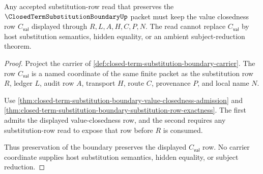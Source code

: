 \begin{theorem}
\label{thm:closed-term-substitution-boundary-closed-value-preservation}
Any accepted substitution-row read that preserves the $\ClosedTermSubstitutionBoundaryUp$ packet must keep the value closedness row $C_{\mathsf{val}}$ displayed through $R,L,A,H,C,P,N$. The read cannot replace $C_{\mathsf{val}}$ by host substitution semantics, hidden equality, or an ambient subject-reduction theorem.
\end{theorem}
\begin{proof}
Project the carrier of \autoref{def:closed-term-substitution-boundary-carrier}. The row $C_{\mathsf{val}}$ is a named coordinate of the same finite packet as the substitution row $R$, ledger $L$, audit row $A$, transport $H$, route $C$, provenance $P$, and local name $N$.

Use \autoref{thm:closed-term-substitution-boundary-value-closedness-admission} and \autoref{thm:closed-term-substitution-boundary-substitution-row-exactness}. The first admits the displayed value-closedness row, and the second requires any substitution-row read to expose that row before $R$ is consumed.

Thus preservation of the boundary preserves the displayed $C_{\mathsf{val}}$ row. No carrier coordinate supplies host substitution semantics, hidden equality, or subject reduction.
\end{proof}

